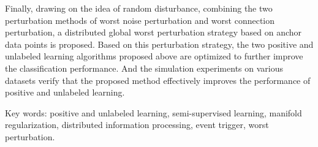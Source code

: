 Finally, drawing on the idea of random disturbance, combining the two perturbation methods of worst noise perturbation and worst connection perturbation, a distributed global worst perturbation strategy based on anchor data points is proposed. Based on this perturbation strategy, the two positive and unlabeled learning algorithms proposed above are optimized to further improve the classification performance.
And the simulation experiments on various datasets verify that the proposed method effectively improves the performance of positive and unlabeled learning.

Key words: positive and unlabeled learning, semi-supervised learning, manifold regularization, distributed information processing, event trigger, worst perturbation.